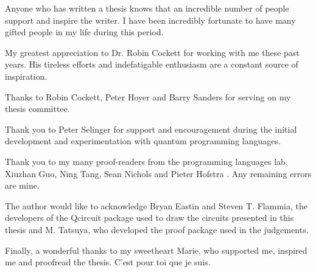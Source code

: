 Anyone who has written a thesis knows that an incredible number of people 
support and inspire the writer. I have been incredibly fortunate to have
many gifted people in my life during this period. 

My greatest appreciation to Dr. Robin Cockett for working with me
these past years. His tireless efforts and indefatigable enthusiasm
are a constant source of inspiration.

Thanks to Robin Cockett, Peter Hoyer and Barry Sanders for serving 
on my thesis committee.

Thank you to Peter Selinger for support and encouragement during the 
initial development and experimentation with quantum programming languages.


Thank you to my many proof-readers from the
programming languages lab, Xiuzhan Guo, Ning Tang, Sean Nichols
and Pieter Hofstra . Any remaining errors are mine.


The author would like to acknowledge Bryan Eastin and Steven T. Flammia, 
the developers of the 
 Qcircuit  package  used 
to draw the circuits presented in this thesis and  M. Tatsuya, who developed
the proof package used in the judgements.

Finally, a wonderful thanks to my sweetheart Marie, who supported me,
inspired me and proofread the thesis. C'est pour toi que je suis.

